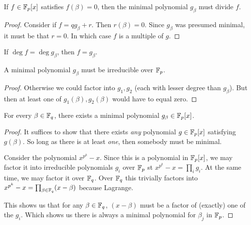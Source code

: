 \begin{proposition}
  If $f \in \mathbb{F}_p[x]$ satisfies $f(\beta) = 0$, then the minimal
  polynomial $g_\beta$ must divide $f$.
\end{proposition}

\begin{proof}
  Consider if $f = qg_\beta + r$. Then $r(\beta) = 0$. Since $g_\beta$
  was presumed minimal, it must be that $r = 0$. In which case $f$ is a
  multiple of $g$.
\end{proof}

\begin{corollary}
  If $\deg f = \deg g_\beta$, then $f = g_\beta$.
\end{corollary}

\begin{proposition}
  A minimal polynomial $g_\beta$ must be irreducible over $\mathbb{F}_p$.
\end{proposition}

\begin{proof}
  Otherwise we could factor into $g_1, g_2$ (each with lesser degree
  than $g_\beta$). But then at least one of $g_1(\beta), g_2(\beta)$
  would have to equal zero.
\end{proof}

\begin{proposition}
  For every $\beta \in \mathbb{F}_q$, there exists a minimal polynomial $g_\beta
  \in \mathbb{F}_p[x]$.
\end{proposition}

\begin{proof}
  It suffices to show that there exists \emph{any} polynomial $g \in
  \mathbb{F}_p[x]$ satisfying $g(\beta)$. So long as there is at least
  \emph{one}, then somebody must be minimal.

  Consider the polynomial $x^{p^k} - x$. Since this is a polynomial in
  $\mathbb{F}_p[x]$, we may factor it into irreducible polynomials $g_i$ over
  $\mathbb{F}_p$ st $x^{p^k} - x = \prod_i g_i$. At the same time, we may factor
  it over $\mathbb{F}_q$. Over $\mathbb{F}_q$ this trivially factors into $x^{p^k} - x =
  \prod_{\beta\in\mathbb{F}_q} (x - \beta)$ because Lagrange.

  This shows us that for any $\beta\in\mathbb{F}_q$, $(x - \beta)$ must be a
  factor of (exactly) one of the $g_i$. Which shows us there is always a
  minimal polynomial for $\beta_j$ in $\mathbb{F}_p$.
\end{proof}

